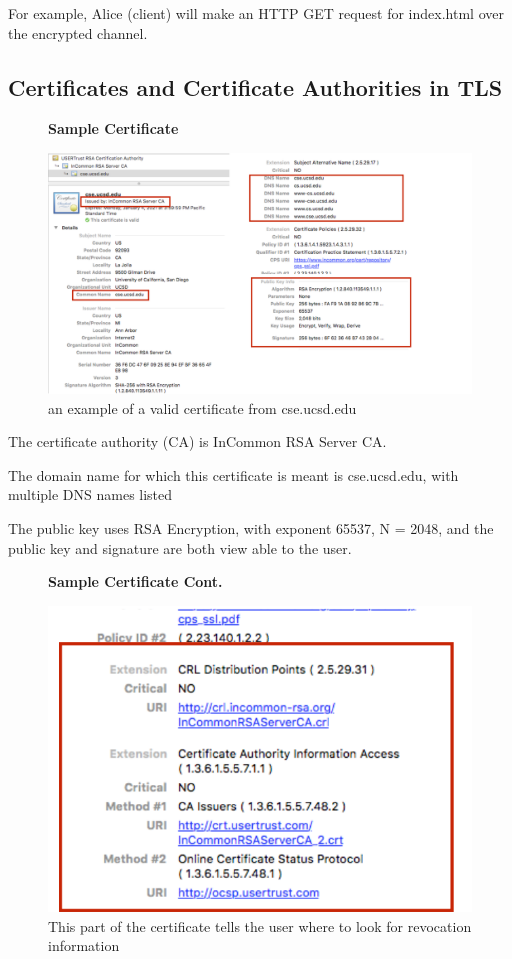 \documentclass[11pt]{article} %
\begin{document}
\noindent For example, Alice (client) will make an HTTP GET request for index.html over 
the encrypted channel.

\subsection{Certificates and Certificate Authorities in TLS}
\begin{figure}[H]
    \centering
    \textbf{Sample Certificate}\par\medskip
    \includegraphics[scale=.4]{./cert1.png}
    \caption{an example of a valid certificate from cse.ucsd.edu}
\end{figure}

\smallskip
\noindent The certificate authority (CA) is InCommon RSA Server CA.

\smallskip
\noindent The domain name for which this certificate is meant is 
cse.ucsd.edu, with multiple DNS names listed

\smallskip
\noindent The public key uses RSA Encryption, with exponent 65537, N = 2048,
and the public key and signature are both view able to the user.

\begin{figure}[H]
    \centering
    \textbf{Sample Certificate Cont.}\par\medskip
    \includegraphics[scale=.5]{./cert2.png}
    \caption{This part of the certificate tells the user where to look for 
    revocation information}
\end{figure}
\end{document}
